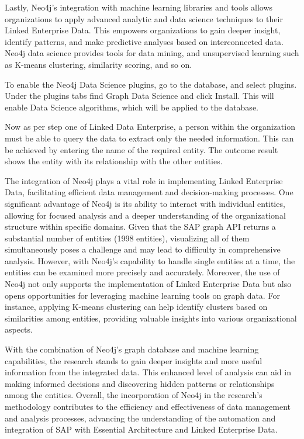 \documentclass{article}
\begin{document}
Lastly, Neo4j’s integration with machine learning libraries and tools allows organizations to apply advanced analytic and data science techniques to their Linked Enterprise Data. This empowers organizations to gain deeper insight, identify patterns, and make predictive analyses based on interconnected data. Neo4j data science provides tools for data mining, and unsupervised learning such as K-means clustering, similarity scoring, and so on. \parencite{hodler2022a}

To enable the Neo4j Data Science plugins, go to the database, and select plugins. Under the plugins tabs find Graph Data Science and click Install. This will enable Data Science algorithms, which will be applied to the database. 

Now as per step one of Linked Data Enterprise, a person within the organization must be able to query the data to extract only the needed information. This can be achieved by entering the name of the required entity. The outcome result shows the entity with its relationship with the other entities.

The integration of Neo4j plays a vital role in implementing Linked Enterprise Data, facilitating efficient data management and decision-making processes. One significant advantage of Neo4j is its ability to interact with individual entities, allowing for focused analysis and a deeper understanding of the organizational structure within specific domains. Given that the SAP graph API returns a substantial number of entities (1998 entities), visualizing all of them simultaneously poses a challenge and may lead to difficulty in comprehensive analysis. However, with Neo4j's capability to handle single entities at a time, the entities can be examined more precisely and accurately.
Moreover, the use of Neo4j not only supports the implementation of Linked Enterprise Data but also opens opportunities for leveraging machine learning tools on graph data. For instance, applying K-means clustering can help identify clusters based on similarities among entities, providing valuable insights into various organizational aspects.

With the combination of Neo4j's graph database and machine learning capabilities, the research stands to gain deeper insights and more useful information from the integrated data. This enhanced level of analysis can aid in making informed decisions and discovering hidden patterns or relationships among the entities. Overall, the incorporation of Neo4j in the research's methodology contributes to the efficiency and effectiveness of data management and analysis processes, advancing the understanding of the automation and integration of SAP with Essential Architecture and Linked Enterprise Data. \parencite{hodler2022a}
\end{document}
